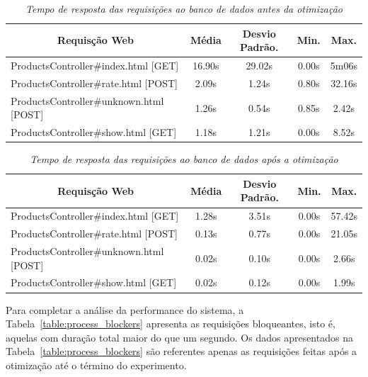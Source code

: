 \begin{table}[htbp]\centering
\begin{tabular}{l c c c c }\hline\hline
\multicolumn{1}{c}{\textbf{Requisção Web}}
& \textbf{Média}
& \textbf{Desvio Padrão.}
& \textbf{Min.} 
& \textbf{Max.} \\ \hline
ProductsController\#index.html [GET]    & 16.90s & 29.02s &  0.00s &  5m06s \\
ProductsController\#rate.html [POST]    &  2.09s &  1.24s &  0.80s & 32.16s \\
ProductsController\#unknown.html [POST] &  1.26s &  0.54s &  0.85s &  2.42s \\
ProductsController\#show.html [GET]     &  1.18s &  1.21s &  0.00s &  8.52s \\
\end{tabular}
\caption{\it Tempo de resposta das requisições ao banco de dados antes da otimização \label{table:before_stats}}
\end{table}

\begin{table}[htbp]\centering
\begin{tabular}{l c c c c }\hline\hline
\multicolumn{1}{c}{\textbf{Requisção Web}}
& \textbf{Média}
& \textbf{Desvio Padrão.}
& \textbf{Min.} 
& \textbf{Max.} \\ \hline
ProductsController\#index.html [GET]    & 1.28s &  3.51s &  0.00s & 57.42s \\
ProductsController\#rate.html [POST]    & 0.13s &  0.77s &  0.00s & 21.05s \\
ProductsController\#unknown.html [POST] & 0.02s &  0.10s &  0.00s &  2.66s \\
ProductsController\#show.html [GET]     & 0.02s &  0.12s &  0.00s &  1.99s \\
\end{tabular}
\caption{\it Tempo de resposta das requisições ao banco de dados após a otimização \label{table:after_stats}}
\end{table}

Para completar a análise da performance do sistema, a Tabela~\ref{table:process_blockers} apresenta as requisições bloqueantes, isto é, aquelas com duração total maior do que um segundo. Os dados apresentados na Tabela~\ref{table:process_blockers} são referentes apenas as requisições feitas após a otimização até o término do experimento.

